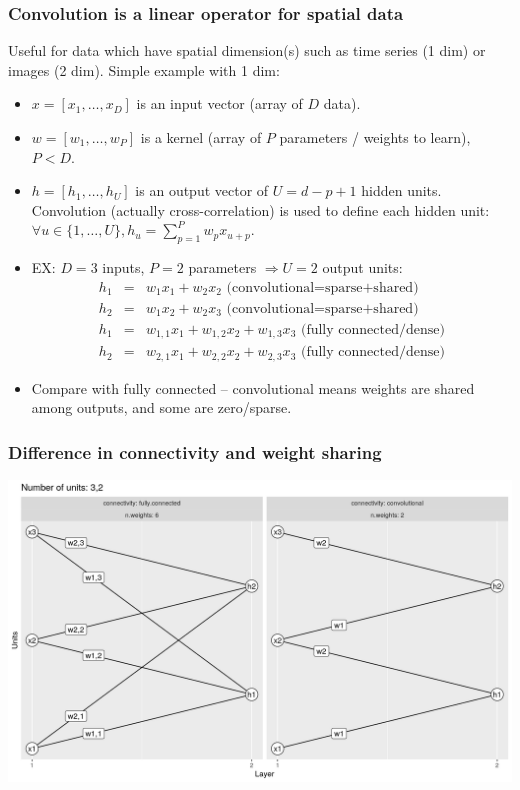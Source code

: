 \documentclass{beamer}
\begin{document}
\begin{frame}
  \frametitle{Convolution is a linear operator for spatial data}
  Useful for data which have spatial dimension(s) such as time series
  (1 dim) or images (2 dim). Simple example with 1 dim:
  \begin{itemize}
  \item $x = [ x_1, \dots, x_D ]$ is an input vector (array of $D$ data).
  \item $w = [ w_1, \dots, w_P ]$ is a kernel (array of $P$ parameters
    / weights to learn), $P<D$.
  \item $h = [ h_1, \dots, h_U ]$ is an output vector of $U=d-p+1$
    hidden units. Convolution (actually cross-correlation) is used to
    define each hidden unit:
    $\forall u\in\{1,\dots,U\}, h_u = \sum_{p=1}^P w_p x_{u+p} $.
\item EX: $D=3$ inputs, $P=2$ parameters $\Rightarrow U=2$ output units:
  \begin{eqnarray*}
    h_1 &=& w_1 x_1 + w_2 x_2 \text{ (convolutional=sparse+shared)}\\ 
    h_2 &=& w_1 x_2 + w_2 x_3 \text{ (convolutional=sparse+shared)}\\
    h_1 &=& w_{1,1} x_1 + w_{1,2} x_2 + w_{1,3} x_3 \text{ (fully connected/dense)}\\ 
    h_2 &=& w_{2,1} x_1 + w_{2,2} x_2 + w_{2,3} x_3 \text{ (fully connected/dense)} 
  \end{eqnarray*}
\item Compare with fully connected -- convolutional means weights are
  shared among outputs, and some are zero/sparse.
  \end{itemize}
\end{frame}

\begin{frame}
  \frametitle{Difference in connectivity and weight sharing}
  \includegraphics[width=\textwidth]{figure-convolutional-3-2}
\end{frame}
\end{document}
